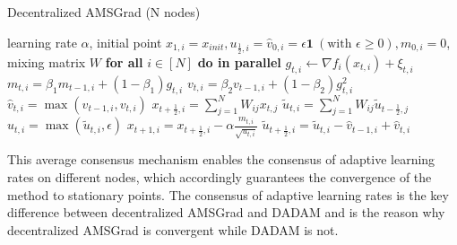 \documentclass[11pt]{article}
\begin{document}
\begin{algorithm}[t]
	\caption{Decentralized AMSGrad (N nodes)}
	\label{alg: damsgrad}
	\begin{algorithmic}[1]
		 learning rate $\alpha$, initial point $x_{1,i} = x_{init}, u_{\frac{1}{2},i} = \hat v_{0,i} = \epsilon \mathbf 1\ (\text{with } \epsilon \geq 0), m_{0,i}=0$, mixing matrix $W$ 
		\STATE \textbf{for all }$i \in [N]$ \textbf{do in parallel}
		\STATE \quad $g_{t,i}  \leftarrow \nabla f_i(x_{t,i}) + \xi_{t,i}$
		\STATE \quad $m_{t,i} = \beta_1 m_{t-1,i} + (1-\beta_1) g_{t,i}$ 
		\STATE \quad  $ v_{t,i} = \beta_2 v_{t-1,i} + (1-\beta_2) g_{t,i}^2 $
		\STATE  \quad $\hat v_{t,i} = \max (\hat v_{t-1,i}, v_{t,i} )$
		\STATE \quad $x_{t+\frac{1}{2},i} = \sum_{j=1}^N W_{ij}x_{t,j}$
		\STATE \quad $\tilde u_{t,i} = \sum_{j=1}^N W_{ij}\tilde u_{t-\frac{1}{2},j}$
	    \STATE \quad $u_{t,i} = \max(\tilde u_{t,i}, \epsilon)$
		\STATE \quad $x_{t+1,i} = x_{t+\frac{1}{2},i} - \alpha \frac{m_{t,i}}{\sqrt{u_{t,i}}}$
		\STATE \quad $\tilde u_{t+\frac{1}{2},i} = \tilde u_{t,i} - \hat v_{t-1,i} + \hat v_{t,i}$
		\ENDFOR
	\end{algorithmic}
\end{algorithm}


This average consensus mechanism enables the consensus of adaptive learning rates on different nodes, which accordingly guarantees the convergence of the method to stationary points. 
The consensus of adaptive learning rates is the key difference between decentralized AMSGrad and DADAM and is the reason why decentralized AMSGrad is  convergent while DADAM is not.





\newpage
\end{document}
